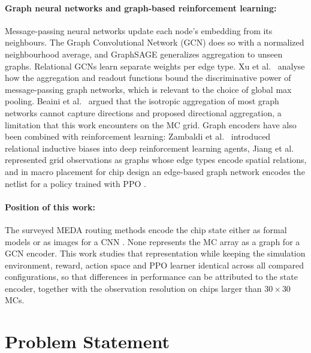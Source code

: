 \documentclass[11pt,a4paper]{article}
\begin{document}
\paragraph{Graph neural networks and graph-based reinforcement learning:}
Message-passing neural networks \cite{gilmer2017} update each node's
embedding from its neighbours. The Graph Convolutional Network (GCN)
\cite{kipf2017} does so with a normalized neighbourhood average, and
GraphSAGE \cite{hamilton2017} generalizes aggregation to unseen graphs.
Relational GCNs \cite{schlichtkrull2018} learn separate weights per edge
type. Xu et al.\ \cite{xu2019} analyse how the aggregation and readout
functions bound the discriminative power of message-passing graph networks,
which is relevant to the choice of global max pooling. Beaini et al.\
\cite{beaini2021} argued that the
isotropic aggregation of most graph networks cannot capture directions and
proposed directional aggregation, a limitation that this work encounters on
the MC grid. Graph encoders have also been combined with reinforcement
learning: Zambaldi et al.\ \cite{zambaldi2019} introduced relational inductive
biases into deep reinforcement learning agents, Jiang et al.\ \cite{jiang2021}
represented grid observations as graphs whose edge types encode spatial
relations, and in macro placement for chip design an edge-based graph network
encodes the netlist for a policy trained with PPO \cite{mirhoseini2021}.

\paragraph{Position of this work:}
The surveyed MEDA routing methods encode the chip state either as formal
models \cite{elfar2022tcad} or as images for a CNN \cite{elfar2023,liang2021}.
None represents the MC array as a graph for a GCN encoder. This work studies
that representation while keeping the simulation environment, reward, action
space and PPO learner identical across all compared configurations, so that
differences in performance can be attributed to the state encoder, together
with the observation resolution on chips larger than $30\times30$ MCs.

\section{Problem Statement}\label{sec:problem}
\end{document}
